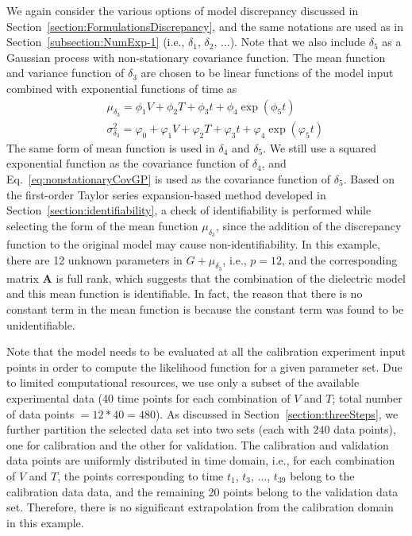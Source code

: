 \documentclass[preprint,review,12pt,3p]{elsarticle}
\begin{document}
We again consider the various options of model discrepancy discussed in Section~\ref{section:FormulationsDiscrepancy}, and the same notations are used as in Section~\ref{subsection:NumExp-1} (i.e., $\delta_1$, $\delta_2$, ...). Note that we also include $\delta_5$ as a Gaussian process with non-stationary covariance function. The mean function and variance function of $\delta_3$ are chosen to be linear functions of the model input combined with exponential functions of time as
\begin{eqnarray}\label{eq:meanAndvariance-NumExp-2}
&& \mu_{\delta_3} = \phi_1 V + \phi_2 T + \phi_3 t + \phi_4 \exp(\phi_5 t) \nonumber\\
&& \sigma^2_{\delta_3} = \varphi_0 + \varphi_1 V + \varphi_2 T + \varphi_3 t + \varphi_4 \exp(\varphi_5 t)
\end{eqnarray}
The same form of mean function is used in $\delta_4$ and $\delta_5$. We still use a squared exponential function as the covariance function of $\delta_4$, and Eq.~\ref{eq:nonstationaryCovGP} is used as the covariance function of $\delta_5$. Based on the first-order Taylor series expansion-based method developed in Section~\ref{section:identifiability}, a check of identifiability is performed while selecting the form of the mean function $\mu_{\delta_3}$, since the addition of the discrepancy function to the original model may cause non-identifiability. In this example, there are 12 unknown parameters in $G+\mu_{\delta_3}$, i.e., $p=12$, and the corresponding matrix $\boldsymbol{A}$ is full rank, which suggests that the combination of the dielectric model and this mean function is identifiable. In fact, the reason that there is no constant term in the mean function is because the constant term was found to be unidentifiable. 

Note that the model needs to be evaluated at all the calibration experiment input points in order to compute the likelihood function for a given parameter set. Due to limited computational resources, we use only a subset of the available experimental data (40 time points for each combination of $V$ and $T$; total number of data points $=12*40=480$). As discussed in Section~\ref{section:threeSteps}, we further partition the selected data set into two sets (each with $240$ data points), one for calibration and the other for validation. The calibration and validation data points are uniformly distributed in time domain, i.e., for each combination of $V$ and $T$, the points corresponding to time $t_1$, $t_3$, ..., $t_{39}$ belong to the calibration data data, and the remaining 20 points belong to the validation data set. Therefore, there is no significant extrapolation from the calibration domain in this example.
\end{document}
